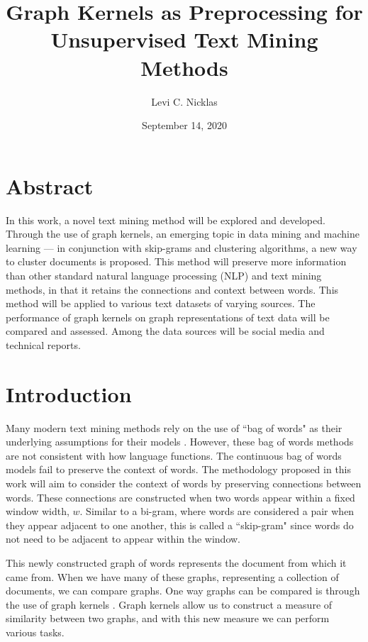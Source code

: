 \documentclass[11pt]{report}
\begin{document}
\title{Graph Kernels as Preprocessing for Unsupervised Text Mining Methods}
\author{Levi C. Nicklas}
\date{September 14, 2020}
\maketitle

\section{Abstract}

\hspace*{0.5cm} In this work, a novel text mining method will be explored and developed. Through the use of graph kernels, an emerging topic in data mining and machine learning --- in conjunction with skip-grams and clustering algorithms, a new way to cluster documents is proposed. This method will preserve more information than other standard natural language processing (NLP) and text mining methods, in that it retains the connections and context between words. This method will be applied to various text datasets of varying sources. The performance of graph kernels on graph representations of text data will be compared and assessed. Among the data sources will be social media and technical reports. 





\section{Introduction}

\hspace*{0.5cm} Many modern text mining methods rely on the use of ``bag of words" as their underlying assumptions for their models \cite{nikolentzos2017shortest}. However, these bag of words methods are not consistent with how language functions. The continuous bag of words models fail to preserve the context of words. The methodology proposed in this work will aim to consider the context of words by preserving connections between words. These connections are constructed when two words appear within a fixed window width, $w$. Similar to a bi-gram, where words are considered a pair when they appear adjacent to one another, this is called a ``skip-gram" since words do not need to be adjacent to appear within the window. 

This newly constructed graph of words represents the document from which it came from. When we have many of these graphs, representing a collection of documents, we can compare graphs. One way graphs can be compared is through the use of graph kernels \cite{kriege2020survey}. Graph kernels allow us to construct a measure of similarity between two graphs, and with this new measure we can perform various tasks.
\end{document}
